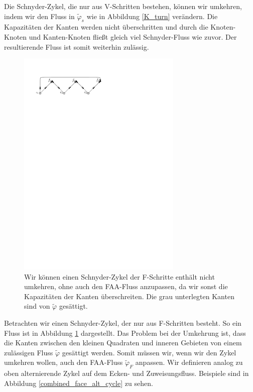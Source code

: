 Die Schnyder-Zykel, die nur aus V-Schritten bestehen, können wir umkehren, indem wir den Fluss in $\tilde{\varphi}_s$ wie in Abbildung \ref{K_turn} verändern. Die Kapazitäten der Kanten werden nicht überschritten und durch die Knoten-Knoten und Kanten-Knoten fließt gleich viel Schnyder-Fluss wie zuvor. Der resultierende Fluss ist somit weiterhin zulässig.

\begin{figure}[h]
\centering
\includegraphics[width=0.7\textwidth]{G_kreis.pdf}
\caption{Wir können einen Schnyder-Zykel der F-Schritte enthält nicht umkehren, ohne auch den FAA-Fluss anzupassen, da wir sonst die Kapazitäten der Kanten überschreiten. Die grau unterlegten Kanten sind von $\tilde{\varphi}$ gesättigt.}
\label{G_turn}
\end{figure}

Betrachten wir einen Schnyder-Zykel, der nur aus F-Schritten besteht. So ein Fluss ist in Abbildung \ref{G_turn} dargestellt. Das Problem bei der Umkehrung ist, dass die Kanten zwischen den kleinen Quadraten und inneren Gebieten von einem zulässigen Fluss $\tilde{\varphi}$ gesättigt werden. Somit müssen wir, wenn wir den Zykel umkehren wollen, auch den FAA-Fluss $\tilde{\varphi}_F$ anpassen. Wir definieren analog zu oben alternierende Zykel auf dem Ecken- und Zuweisungsfluss. Beispiele sind in Abbildung \ref{combined_face_alt_cycle} zu sehen.


